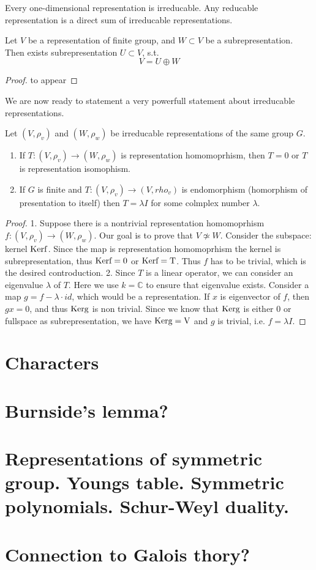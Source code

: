 \documentclass{amsart}
\def\ker{\rm Ker}
\begin{document}
\begin{lemma}
    Every one-dimensional representation is irreducable. Any reducable representation is a direct sum of irreducable representations.
\end{lemma}

\begin{theorem}
    Let $V$ be a representation of finite group, and $W \subset V$ be a subrepresentation. Then exists subrepresentation $U\subset V$, s.t.
    $$ V = U \oplus W$$
\end{theorem}

\begin{proof}
    to appear
\end{proof}

We are now ready to statement a very powerfull statement about irreducable representations.

\begin{lemma}
    Let $(V, \rho_v)$ and $(W, \rho_w)$ be irreducable representations of the same group $G$.
    \begin{enumerate}
        \item If $T: (V, \rho_v) \to (W, \rho_w)$ is representation homomoprhism, then $T=0$ or $T$ is representation isomophism.
        \item If $G$ is finite and $T : (V, \rho_v) \to (V, rho_v) $ is endomorphism (homorphism of presentation to itself) then $T = \lambda I$ for some colmplex number $\lambda$.
    \end{enumerate}
\end{lemma}
\begin{proof} 
    1. Suppose there is a nontrivial representation homomoprhism $f : (V, \rho_v) \to (W, \rho_w)$. Our goal is to prove that $V \not\simeq W$. Consider the subspace: kernel $\ker f$. Since the map is representation homomoprhism the kernel is subrepresentation, thus $\ker f = 0$ or $\ker f = T$. Thus $f$ has to be trivial, which is the desired controduction. 
    2. Since $T$ is a linear operator, we can consider an eigenvalue $\lambda$ of $T$. Here we use $k = \mathbb{C}$ to ensure that eigenvalue exists. Consider a map $g = f - \lambda \cdot id$, which would be a representation. If $x$ is eigenvector of $f$, then $g x = 0$, and thus $\ker g$ is non trivial. Since we know that 
    $\ker g$ is either 0 or fullspace as subrepresentation, we have $\ker g = V$ and $g$ is trivial, i.e. $f = \lambda I$.
\end{proof}



\section{Characters}

\section{Burnside's lemma?}

\section{Representations of symmetric group. Youngs table. Symmetric polynomials. Schur-Weyl duality. }

\section{Connection to Galois thory?}
\end{document}
